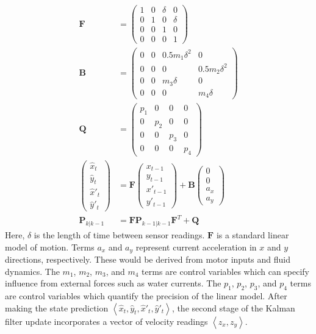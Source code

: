 \documentclass[letterpaper]{article}
\begin{document}
\begin{align}
\mathbf{F} &= \begin{pmatrix}
1 & 0 & \delta & 0 \\
0 & 1 & 0 & \delta \\
0 & 0 & 1 & 0 \\
0 & 0 & 0 & 1
\end{pmatrix} \\
\mathbf{B} &= \begin{pmatrix}
0 & 0 & 0.5 m_1\delta^2 & 0 \\
0 & 0 & 0 & 0.5 m_2 \delta^2 \\
0 & 0 & m_3 \delta & 0 \\
0 & 0 & 0 & m_4 \delta
\end{pmatrix} \\
\mathbf{Q} &= \begin{pmatrix}
p_1 & 0 & 0 & 0 \\
0 & p_2 & 0 & 0 \\
0 & 0 & p_3 & 0 \\
0 & 0 & 0 & p_4
\end{pmatrix} \\
\begin{pmatrix}
\hat{x}_t \\
\hat{y}_t \\
\hat{x}'_t \\
\hat{y}'_t
\end{pmatrix} &= 
\mathbf{F}
\begin{pmatrix}
x_{t-1} \\
y_{t-1} \\
x'_{t-1} \\
y'_{t-1}
\end{pmatrix}
+ 
\mathbf{B}
\begin{pmatrix}
0 \\
0 \\
a_x \\
a_y
\end{pmatrix} \\
\mathbf{P}_{k|k-1} &= \mathbf{F} \mathbf{P}_{k-1|k-1} \mathbf{F}^T + \mathbf{Q}
\end{align}
Here, $\delta$ is the length of time between sensor readings. $\mathbf{F}$ is a standard linear model of motion.
Terms $a_x$ and $a_y$ represent current acceleration in $x$ and $y$ directions, respectively.
These would be derived from motor inputs and fluid dynamics.
The $m_1$, $m_2$, $m_3$, and $m_4$ terms are control variables which can specify influence from external forces such as water currents.
The $p_1$, $p_2$, $p_3$, and $p_4$ terms are control variables which quantify the precision of the linear model.
After making the state prediction $\left< \hat{x}_t, \hat{y}_t, \hat{x}'_t, \hat{y}'_t \right>$, 
the second stage of the Kalman filter update incorporates a vector of velocity readings $\left< z_x, z_y \right>$.
\end{document}
